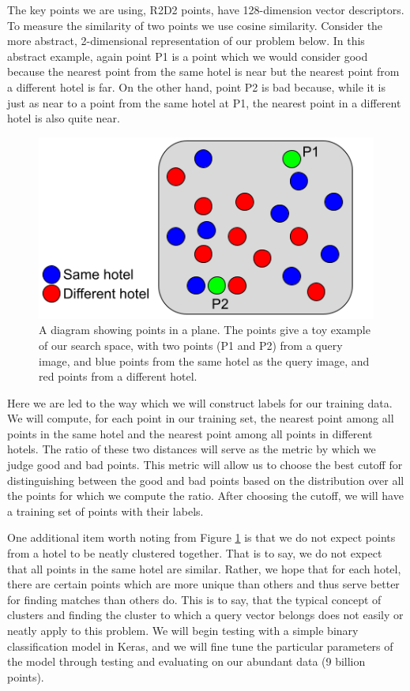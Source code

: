 \documentclass{scrartcl}
\begin{document}
The key points we are using, R2D2 points, have 128-dimension vector descriptors. To measure the similarity of two points we use cosine similarity. Consider the more abstract, 2-dimensional representation of our problem below. In this abstract example, again point P1 is a point which we would consider good because the nearest point from the same hotel is near but the nearest point from a different hotel is far. On the other hand, point P2 is bad because, while it is just as near to a point from the same hotel at P1, the nearest point in a different hotel is also quite near.

\begin{figure}
\begin{center}
\includegraphics[scale=.7]{points_diagram}
\end{center}
\caption{A diagram showing points in a plane. The points give a toy example of our search space, with two points (P1 and P2) from a query image, and blue points from the same hotel as the query image, and red points from a different hotel.}
\label{dia}
\end{figure}

Here we are led to the way which we will construct labels for our training data. We will compute, for each point in our training set, the nearest point among all points in the same hotel and the nearest point among all points in different hotels. The ratio of these two distances will serve as the metric by which we judge good and bad points. This metric will allow us to choose the best cutoff for distinguishing between the good and bad points based on the distribution over all the points for which we compute the ratio. After choosing the cutoff, we will have a training set of points with their labels. 

One additional item worth noting from Figure \ref{dia} is that we do not expect points from a hotel to be neatly clustered together. That is to say, we do not expect that all points in the same hotel are similar. Rather, we hope that for each hotel, there are certain points which are more unique than others and thus serve better for finding matches than others do. This is to say, that the typical concept of clusters and finding the cluster to which a query vector belongs does not easily or neatly apply to this problem. We will begin testing with a simple binary classification model in Keras, and we will fine tune the particular parameters of the model through testing and evaluating on our abundant data (9 billion points).
\end{document}
